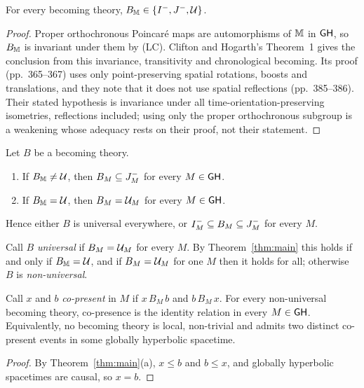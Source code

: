 \begin{theorem}\label{thm:flat}
For every becoming theory, $B_\mathbb M\in\{I^{-},J^{-},\mathcal U\}$.
\end{theorem}

\begin{proof}
Proper orthochronous Poincaré maps are automorphisms of $\mathbb M$ in $\mathsf{GH}$, so
$B_\mathbb M$ is invariant under them by (LC). Clifton and Hogarth's Theorem~1
\citep[p.~365]{CH1995} gives the conclusion from this invariance,
transitivity and chronological becoming. Its proof (pp.~365--367) uses only
point-preserving spatial rotations, boosts and translations, and they note
that it does not use spatial reflections (pp.~385--386). Their stated
hypothesis is invariance under all time-orientation-preserving isometries,
reflections included; using only the proper orthochronous subgroup is a
weakening whose adequacy rests on their proof, not their statement.
\end{proof}

\begin{theorem}\label{thm:main}
Let $B$ be a becoming theory.
\begin{enumerate}
\item[(a)] If $B_\mathbb M\neq\mathcal U$, then $B_M\subseteq J^{-}_M$ for every $M\in\mathsf{GH}$.
\item[(b)] If $B_\mathbb M=\mathcal U$, then $B_M=\mathcal U_M$ for every $M\in\mathsf{GH}$.
\end{enumerate}
Hence either $B$ is universal everywhere, or $I^{-}_M\subseteq
B_M\subseteq J^{-}_M$ for every $M$.
\end{theorem}

Call $B$ \emph{universal} if $B_M=\mathcal U_M$ for every $M$. By
Theorem~\ref{thm:main} this holds if and only if $B_\mathbb M=\mathcal U$, and if $B_M=\mathcal U_M$
for one $M$ then it holds for all; otherwise $B$ is \emph{non-universal}.

\begin{corollary}\label{cor:nopresent}
Call $x$ and $b$ \emph{co-present} in $M$ if $x\,B_M\,b$ and $b\,B_M\,x$. For
every non-universal becoming theory, co-presence is the identity relation in
every $M\in\mathsf{GH}$. Equivalently, no becoming theory is local, non-trivial and
admits two distinct co-present events in some globally hyperbolic spacetime.
\end{corollary}

\begin{proof}
By Theorem~\ref{thm:main}(a), $x\le b$ and $b\le x$, and globally hyperbolic
spacetimes are causal, so $x=b$.
\end{proof}

